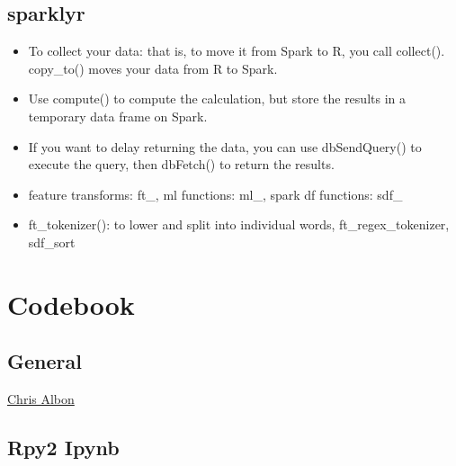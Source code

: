 \documentclass[]{book}
\begin{document}
\hypertarget{sparklyr}{%
\section{sparklyr}\label{sparklyr}}

\begin{itemize}
\item
  To collect your data: that is, to move it from Spark to R, you call collect(). copy\_to() moves your data from R to Spark.
\item
  Use compute() to compute the calculation, but store the results in a temporary data frame on Spark.
\item
  If you want to delay returning the data, you can use dbSendQuery() to execute the query, then dbFetch() to return the results.
\item
  feature transforms: ft\_, ml functions: ml\_, spark df functions: sdf\_
\item
  ft\_tokenizer(): to lower and split into individual words, ft\_regex\_tokenizer, sdf\_sort
\end{itemize}

\hypertarget{codebook}{%
\chapter{Codebook}\label{codebook}}

\hypertarget{general-11}{%
\section{General}\label{general-11}}

\href{http://chrisalbon.com/}{Chris Albon}

\hypertarget{rpy2-ipynb}{%
\section{Rpy2 Ipynb}\label{rpy2-ipynb}}
\end{document}
